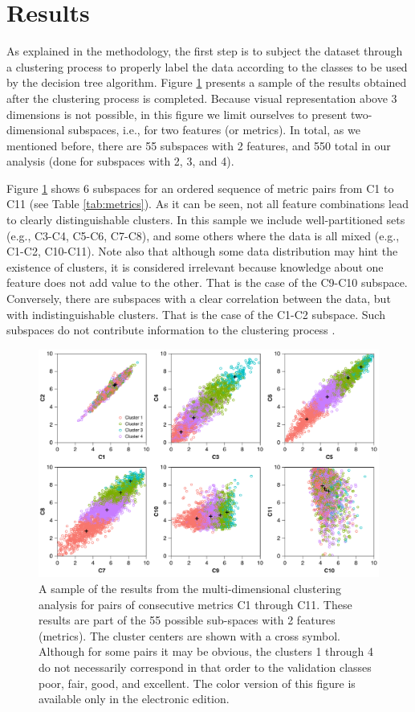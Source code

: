 
\section{Results}
\label{sec:results}

As explained in the methodology, the first step is to subject the dataset through a clustering process to properly label the data according to the classes to be used by the decision tree algorithm. Figure \ref{fig:clusters} presents a sample of the results obtained after the clustering process is completed. Because visual representation above 3 dimensions is not possible, in this figure we limit ourselves to present two-dimensional subspaces, i.e., for two features (or metrics). In total, as we mentioned before, there are 55 subspaces with 2 features, and 550 total in our analysis (done for subspaces with 2, 3, and 4). 

Figure \ref{fig:clusters} shows 6 subspaces for an ordered sequence of metric pairs from C1 to C11 (see Table \ref{tab:metrics}). As it can be seen, not all feature combinations lead to clearly distinguishable clusters. In this sample we include well-partitioned sets (e.g., C3-C4, C5-C6, C7-C8), and some others where the data is all mixed (e.g., C1-C2, C10-C11). Note also that although some data distribution may hint the existence of clusters, it is considered irrelevant because knowledge about one feature does not add value to the other. That is the case of the C9-C10 subspace. Conversely, there are subspaces with a clear correlation between the data, but with indistinguishable clusters. That is the case of the C1-C2 subspace. Such subspaces do not contribute information to the clustering process \citep{Dy_2004_MLR}. 

\begin{figure}
	\centering
	\includegraphics[width=\textwidth]{figures/pdf/figure-05}
	\caption{A sample of the results from the multi-dimensional clustering analysis for pairs of consecutive metrics C1 through C11. These results are part of the 55 possible sub-spaces with 2 features (metrics). The cluster centers are shown with a cross symbol. Although for some pairs it may be obvious, the clusters 1 through 4 do not necessarily correspond in that order to the validation classes poor, fair, good, and excellent. The color version of this figure is available only in the electronic edition.}
	\label{fig:clusters}
\end{figure}

